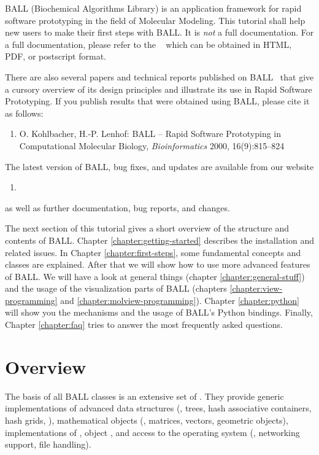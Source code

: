 BALL (Biochemical Algorithms Library) is an application framework for rapid
software prototyping in the field of Molecular Modeling.  This tutorial shall
help new users to make their first steps with BALL. It is {\em not} a full
documentation. For a full documentation, please refer to the ~\cite{BALL-RM} which can be obtained in HTML, PDF, or postscript format.

There are also several papers and technical reports published on
BALL~\cite{BKL2000,BKL99a,BKL99b,KL99,Koh2001} that give a cursory overview 
of its design principles and illustrate its use in Rapid Software Prototyping. If you
publish results that were obtained using BALL, please cite it as follows:
\begin{enumerate}
	\item[] O. Kohlbacher, H.-P. Lenhof: BALL -- Rapid Software Prototyping
  in Computational Molecular Biology, {\em Bioinformatics} 2000,
	16(9):815--824
\end{enumerate}

\noindent
The latest version of BALL, bug fixes, and updates are available from our website

\begin{enumerate}
  \item[] 
\end{enumerate}

\noindent 
as well as further documentation, bug reports, and changes.

The next section of this tutorial gives a short overview of the structure and
contents of BALL. Chapter \ref{chapter:getting-started} describes the
installation and related issues. In Chapter \ref{chapter:first-steps}, some
fundamental concepts and classes are explained. After that we will show how to
use more advanced features of BALL. We will have a look at general things
(chapter \ref{chapter:general-stuff}) and the usage of the visualization parts
of BALL (chapters \ref{chapter:view-programming} and
\ref{chapter:molview-programming}). Chapter \ref{chapter:python} will show you
the mechanisms and the usage of BALL's Python bindings.  Finally, Chapter
\ref{chapter:faq} tries to answer the most frequently asked questions.

\section{Overview}


The basis of all BALL classes is an extensive set of .  They provide generic implementations of advanced data structures
(\eg, trees, hash associative containers, hash grids, \etc), mathematical
objects (\eg, matrices, vectors, geometric objects), implementations of
, object , and access to the
operating system (\eg, networking support, file handling).

